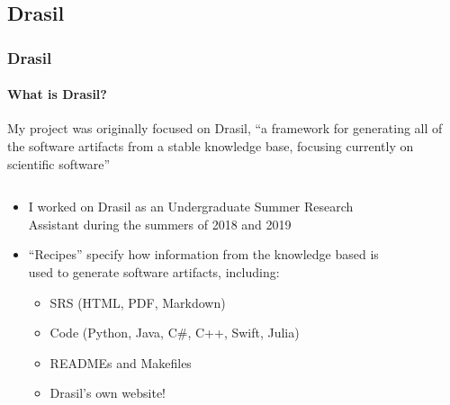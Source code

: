 \subsection{Drasil}

\begin{frame}
    \frametitle{Drasil}
    \framesubtitle{What is Drasil?}
    My project was originally focused on Drasil, ``a framework for generating
    all of the software artifacts from a stable knowledge base, focusing
    currently on scientific software'' \citep{HuntEtAl2021}
    \vspace{-2mm}
    \begin{columns}[T,onlytextwidth]
        \begin{column}{.6\textwidth}
            \vspace{2mm}
            \begin{minipage}{\textwidth}
                \begin{itemize}
                    \item<2-> I worked on Drasil as an Undergraduate Summer
                          Research Assistant during the summers of 2018 and 2019
                    \item<3-> ``Recipes'' specify how information from the
                          knowledge based is used to generate
                          software artifacts, including:
                          \begin{itemize}
                              \item SRS (HTML, PDF, Markdown)
                              \item Code (Python, Java, C\#, C++, Swift, Julia)
                              \item READMEs and Makefiles
                              \item Drasil's own website\footnotemark[1]!
                          \end{itemize}
                \end{itemize}
            \end{minipage}
        \end{column}
        \begin{column}{.35\textwidth}
            \begin{figure}

\end{figure}
\end{column}
\end{columns}
\end{frame}
